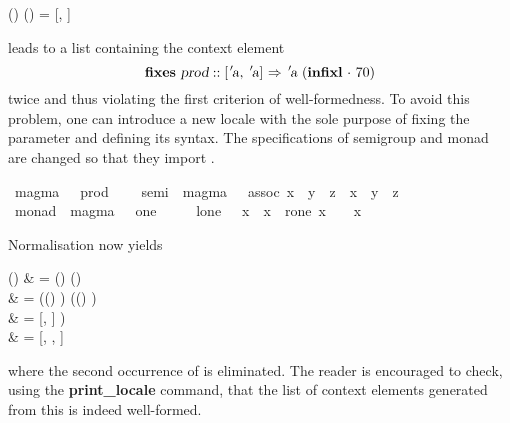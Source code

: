 \begin{isabellebody}
\begin{isamarkuptext}
\begin{align*%
}
       \N() \App \N()
     = [, ]
\end{align*%
}
  leads to a list containing the context element
\[
  \textbf{fixes}~\isa{prod} :: \isa{{\isachardoublequote}{\isacharbrackleft}{\isacharprime}a{\isacharcomma}\ {\isacharprime}a{\isacharbrackright}\ {\isasymRightarrow}\ {\isacharprime}a{\isachardoublequote}}
    ~(\textbf{infixl}~\isa{{\isachardoublequote}{\isasymcdot}{\isachardoublequote}}~70)
\]
  twice and thus violating the first criterion of well-formedness.  To
  avoid this problem, one can
  introduce a new locale  with the sole purpose of fixing the
  parameter and defining its syntax.  The specifications of semigroup
  and monad are changed so that they import .%
\end{isamarkuptext}%
\isamarkuptrue%
\ magma\ {\isacharequal}\ \ prod\ {\isacharparenleft}\ {\isachardoublequote}{\isasymcdot}{\isachardoublequote}\ {}{}{\isacharparenright}\isanewline
\isanewline
\isamarkupfalse%
\ semi{\isacharprime}\ {\isacharequal}\ magma\ {\isacharplus}\ \ assoc{\isacharcolon}\ {\isachardoublequote}{\isacharparenleft}x\ {\isasymcdot}\ y{\isacharparenright}\ {\isasymcdot}\ z\ {\isacharequal}\ x\ {\isasymcdot}\ {\isacharparenleft}y\ {\isasymcdot}\ z{\isacharparenright}{\isachardoublequote}\isanewline
\isamarkupfalse%
\ monad{\isacharprime}\ {\isacharequal}\ magma\ {\isacharplus}\ \ one\ {\isacharparenleft}{\isachardoublequote}{\isasymone}{\isachardoublequote}\ {}{}{}{\isacharparenright}\isanewline
\ \ \ l{\isacharunderscore}one{\isacharcolon}\ {\isachardoublequote}{\isasymone}\ {\isasymcdot}\ x\ {\isacharequal}\ x{\isachardoublequote}\ \ r{\isacharunderscore}one{\isacharcolon}\ {\isachardoublequote}x\ {\isasymcdot}\ {\isasymone}\ {\isacharequal}\ x{\isachardoublequote}\isamarkupfalse%
%
\begin{isamarkuptext}%
Normalisation now yields
\begin{align*%
}
  \N() & =
       \N() \App \N() \\
     & = (\N() ) \App
         (\N() ) \\
     & = [, ] ) \\
     & = [, ,
          ]
\end{align*%
}
  where the second occurrence of  is eliminated.
  The reader is encouraged to check, using the \textbf{print\_locale}
  command, that the list of context elements generated from this is
  indeed well-formed.


\end{isamarkuptext}
\end{isabellebody}
